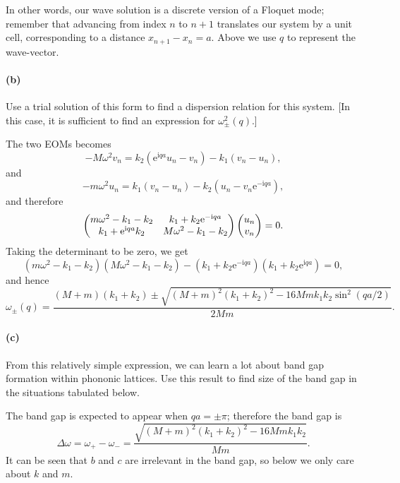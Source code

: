 \documentclass[hyperref, a4paper]{article}
\newcommand*{\ii}{\mathrm{i}}
\newcommand*{\ee}{\mathrm{e}}
\begin{document}
In other words, our wave solution is a discrete version of a Floquet mode; remember that advancing from index $n$ to $n+1$ translates our system by a unit cell, corresponding to a distance $x_{n+1}-x_n=a$. Above we use $q$ to represent the wave-vector.

\paragraph*{(b)} Use a trial solution of this form to find a dispersion relation for this system. [In this case, it is sufficient to find an expression for $\omega_{ \pm}^2(q)$.]

The two EOMs becomes 
\begin{equation}
    - M \omega^2 v_n = k_2 (\ee^{\ii q a} u_n - v_n) - k_1 (v_n - u_n), 
\end{equation}
and 
\begin{equation}
    - m \omega^2 u_n = k_1 (v_n - u_n) - k_2 (u_n - v_n \ee^{- \ii q a}), 
\end{equation}
and therefore 
\begin{equation}
    \pmqty{
        m \omega^2 - k_1 - k_2    & k_1 + k_2 \ee^{- \ii q a} \\
        k_1 + \ee^{\ii q a} k_2   & M \omega^2 - k_1 - k_2 
    } \pmqty{u_n \\ v_n} = 0.
\end{equation}
Taking the determinant to be zero, we get 
\begin{equation}
    (m \omega^2 - k_1 - k_2)(M \omega^2 - k_1 - k_2) - (k_1 + k_2 \ee^{- \ii q a})(k_1 + k_2 \ee^{ \ii q a}) = 0,
\end{equation}
and hence 
\begin{equation}
    \omega_\pm(q) = \frac{
        (M + m)(k_1 + k_2) \pm \sqrt{
            (M+m)^2 (k_1 + k_2)^2 - 16 Mm k_1 k_2 \sin^2 (qa/2)
        }
    }{
        2 Mm
    }.
\end{equation}

\paragraph*{(c)} From this relatively simple expression, we can learn a lot about band gap formation within phononic lattices. Use this result to find size of the band gap in the situations tabulated below.

The band gap is expected to appear when $qa = \pm \pi$;
therefore the band gap is 
\begin{equation}
    \Delta \omega = \omega_+ - \omega_- = 
    \frac{ \sqrt{
        (M+m)^2 (k_1 + k_2)^2 - 16 Mm k_1 k_2 
    }}{Mm}.
\end{equation}
It can be seen that $b$ and $c$ are irrelevant in the band gap, 
so below we only care about $k$ and $m$.
\end{document}
